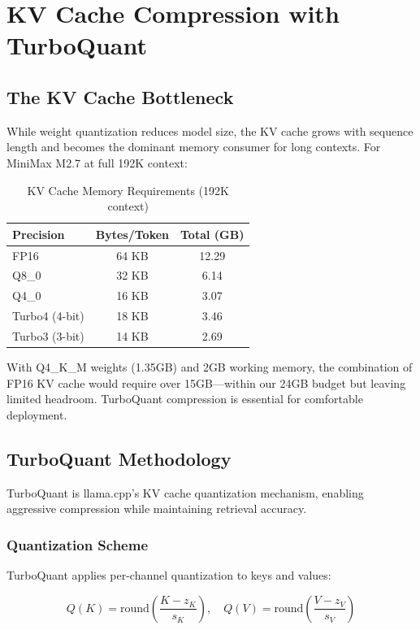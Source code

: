 \section{KV Cache Compression with TurboQuant}
\label{sec:kv_cache}

\subsection{The KV Cache Bottleneck}

While weight quantization reduces model size, the KV cache grows with sequence length and becomes the dominant memory consumer for long contexts. For MiniMax M2.7 at full 192K context:

\begin{table}[h]
\centering
\caption{KV Cache Memory Requirements (192K context)}
\label{tab:kv_requirements}
\begin{tabular}{lcc}
\toprule
\textbf{Precision} & \textbf{Bytes/Token} & \textbf{Total (GB)} \\
\midrule
FP16 & 64 KB & 12.29 \\
Q8\_0 & 32 KB & 6.14 \\
Q4\_0 & 16 KB & 3.07 \\
Turbo4 (4-bit) & 18 KB & 3.46 \\
Turbo3 (3-bit) & 14 KB & 2.69 \\
\bottomrule
\end{tabular}
\end{table}

With Q4\_K\_M weights (1.35GB) and 2GB working memory, the combination of FP16 KV cache would require over 15GB---within our 24GB budget but leaving limited headroom. TurboQuant compression is essential for comfortable deployment.

\subsection{TurboQuant Methodology}

TurboQuant is llama.cpp's KV cache quantization mechanism, enabling aggressive compression while maintaining retrieval accuracy.

\subsubsection{Quantization Scheme}

TurboQuant applies per-channel quantization to keys and values:

\begin{equation}
Q(K) = \text{round}\left(\frac{K - z_K}{s_K}\right), \quad Q(V) = \text{round}\left(\frac{V - z_V}{s_V}\right)
\end{equation}

